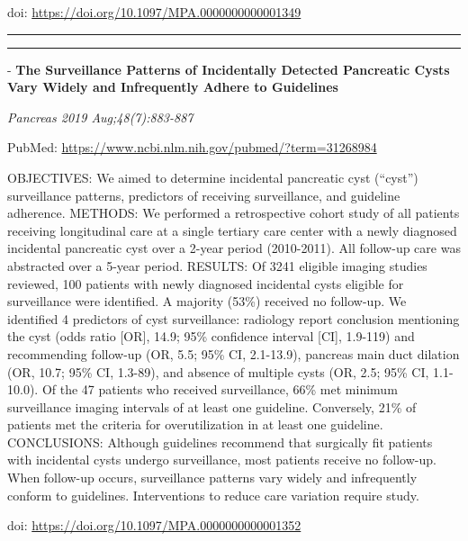 \documentclass[]{article}
\begin{document}
doi: \url{https://doi.org/10.1097/MPA.0000000000001349}

{}

{}

\begin{center}\rule{0.5\linewidth}{\linethickness}\end{center}

\begin{center}\rule{0.5\linewidth}{\linethickness}\end{center}

 - \textbf{The Surveillance Patterns of Incidentally Detected Pancreatic
Cysts Vary Widely and Infrequently Adhere to Guidelines}

\emph{Pancreas 2019 Aug;48(7):883-887}

PubMed: \url{https://www.ncbi.nlm.nih.gov/pubmed/?term=31268984}

OBJECTIVES: We aimed to determine incidental pancreatic cyst (``cyst'')
surveillance patterns, predictors of receiving surveillance, and
guideline adherence. METHODS: We performed a retrospective cohort study
of all patients receiving longitudinal care at a single tertiary care
center with a newly diagnosed incidental pancreatic cyst over a 2-year
period (2010-2011). All follow-up care was abstracted over a 5-year
period. RESULTS: Of 3241 eligible imaging studies reviewed, 100 patients
with newly diagnosed incidental cysts eligible for surveillance were
identified. A majority (53\%) received no follow-up. We identified 4
predictors of cyst surveillance: radiology report conclusion mentioning
the cyst (odds ratio {[}OR{]}, 14.9; 95\% confidence interval {[}CI{]},
1.9-119) and recommending follow-up (OR, 5.5; 95\% CI, 2.1-13.9),
pancreas main duct dilation (OR, 10.7; 95\% CI, 1.3-89), and absence of
multiple cysts (OR, 2.5; 95\% CI, 1.1-10.0). Of the 47 patients who
received surveillance, 66\% met minimum surveillance imaging intervals
of at least one guideline. Conversely, 21\% of patients met the criteria
for overutilization in at least one guideline. CONCLUSIONS: Although
guidelines recommend that surgically fit patients with incidental cysts
undergo surveillance, most patients receive no follow-up. When follow-up
occurs, surveillance patterns vary widely and infrequently conform to
guidelines. Interventions to reduce care variation require study.

doi: \url{https://doi.org/10.1097/MPA.0000000000001352}

{}

{}
\end{document}
